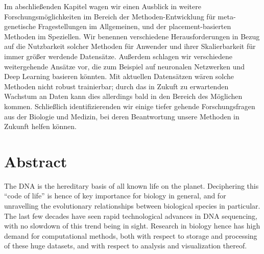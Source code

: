 Im abschlie\ss{}enden Kapitel wagen wir einen Ausblick in weitere Forschungsm\"oglichkeiten im Bereich der
Methoden-Entwicklung f\"ur meta-genetische Fragestellungen im Allgemeinen, und der placement-basierten Methoden im Speziellen.
Wir benennen verschiedene Herausforderungen in Bezug auf die Nutzbarkeit solcher Methoden f\"ur Anwender
und ihrer Skalierbarkeit f\"ur immer gr\"o\ss{}er werdende Datens\"atze.
Au\ss{}erdem schlagen wir verschiedene weitergehende Ans\"atze vor,
die zum Beispiel auf neuronalen Netzwerken und Deep Learning basieren k\"onnten.
Mit aktuellen Datens\"atzen w\"aren solche Methoden nicht robust trainierbar;
durch das in Zukuft zu erwartenden Wachstum an Daten kann dies allerdings bald in den Bereich des M\"oglichen kommen.
Schlie\ss{}lich identifizierenden wir einige tiefer gehende Forschungsfragen aus der Biologie und Medizin,
bei deren Beantwortung unsere Methoden in Zukunft helfen k\"onnen.

\blankpage



\chapter*{Abstract}

The DNA is the hereditary basis of all known life on the planet.
Deciphering this ``code of life'' is hence of key importance for biology in general,
and for unravelling the evolutionary relationships between biological species in particular.
The last few decades have seen rapid technological advances in DNA sequencing,
with no slowdown of this trend being in sight.
Research in biology hence has high demand for computational methods,
both with respect to storage and processing of these huge datasets,
and with respect to analysis and visualization thereof.

